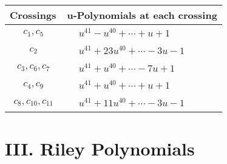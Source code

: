 \documentclass[1p]{elsarticle_modified}
\theoremstyle{definition}
\begin{document}
\begin{tabular}{m{50pt}|m{274pt}}
Crossings & \hspace{64pt}u-Polynomials at each crossing \\
\hline $$\begin{aligned}c_{1},c_{5}\end{aligned}$$&$\begin{aligned}
&u^{41}- u^{40}+\cdots+u+1
\end{aligned}$\\
\hline $$\begin{aligned}c_{2}\end{aligned}$$&$\begin{aligned}
&u^{41}+23 u^{40}+\cdots-3 u-1
\end{aligned}$\\
\hline $$\begin{aligned}c_{3},c_{6},c_{7}\end{aligned}$$&$\begin{aligned}
&u^{41}+u^{40}+\cdots-7 u+1
\end{aligned}$\\
\hline $$\begin{aligned}c_{4},c_{9}\end{aligned}$$&$\begin{aligned}
&u^{41}+u^{40}+\cdots+u+1
\end{aligned}$\\
\hline $$\begin{aligned}c_{8},c_{10},c_{11}\end{aligned}$$&$\begin{aligned}
&u^{41}+11 u^{40}+\cdots-3 u-1
\end{aligned}$\\
\hline
\end{tabular}\newpage\renewcommand{\arraystretch}{1}
\centering \section*{ III. Riley Polynomials}
\end{document}
